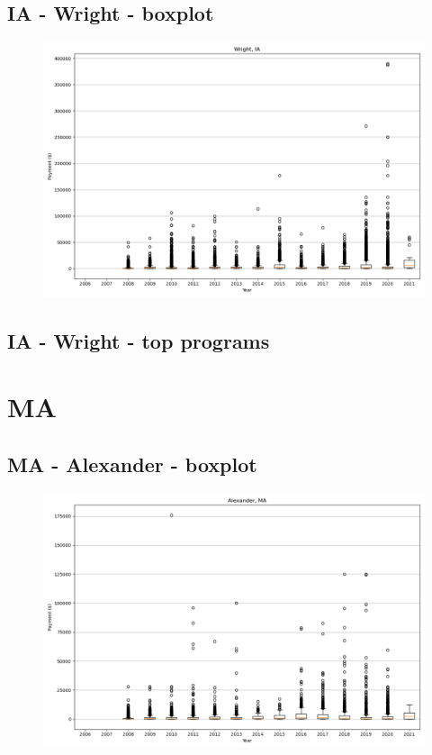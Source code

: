 \subsection*{IA - Wright - boxplot}
\begin{figure}[h]
\centering
\includegraphics[width=7in]{../output/boxplots/counties/Wright-IA_boxplot.png}
\end{figure}


\subsection*{IA - Wright - top programs}

\newpage
\section*{MA}
\subsection*{MA - Alexander - boxplot}
\begin{figure}[h]
\centering
\includegraphics[width=7in]{../output/boxplots/counties/Alexander-MA_boxplot.png}
\end{figure}


